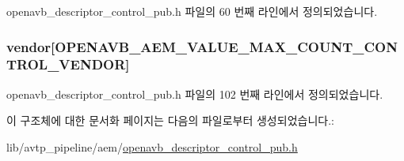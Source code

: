 openavb\+\_\+descriptor\+\_\+control\+\_\+pub.\+h 파일의 60 번째 라인에서 정의되었습니다.

\subsubsection[{\texorpdfstring{vendor}{vendor}}]{ vendor\mbox{[}{\bf O\+P\+E\+N\+A\+V\+B\+\_\+\+A\+E\+M\+\_\+\+V\+A\+L\+U\+E\+\_\+\+M\+A\+X\+\_\+\+C\+O\+U\+N\+T\+\_\+\+C\+O\+N\+T\+R\+O\+L\+\_\+\+V\+E\+N\+D\+OR}\mbox{]}}\hypertarget{structopenavb__aem__descriptor__control__t_a21bb3556d3023ec05552f72df2337d1d}{}\label{structopenavb__aem__descriptor__control__t_a21bb3556d3023ec05552f72df2337d1d}


openavb\+\_\+descriptor\+\_\+control\+\_\+pub.\+h 파일의 102 번째 라인에서 정의되었습니다.



이 구조체에 대한 문서화 페이지는 다음의 파일로부터 생성되었습니다.\+:\begin{DoxyCompactItemize}
\item 
lib/avtp\+\_\+pipeline/aem/\hyperlink{openavb__descriptor__control__pub_8h}{openavb\+\_\+descriptor\+\_\+control\+\_\+pub.\+h}\end{DoxyCompactItemize}
